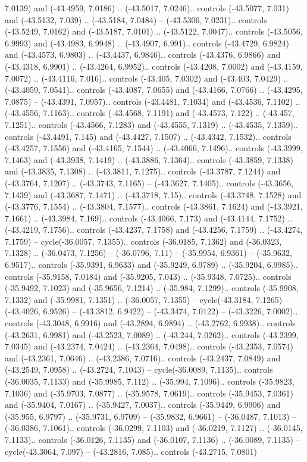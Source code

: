 \begin{scope}[shift={(2.5552, 9.9912)}]
\begin{scope}[shift={(48.1654, -14.8546)}]
7.0139) and (-43.4959, 7.0186) .. (-43.5017, 7.0246).. controls (-43.5077, 7.031) and (-43.5132, 7.039) .. (-43.5184, 7.0484) -- (-43.5306, 7.0231).. controls (-43.5249, 7.0162) and (-43.5187, 7.0101) .. (-43.5122, 7.0047).. controls (-43.5056, 6.9993) and (-43.4983, 6.9948) .. (-43.4907, 6.991).. controls (-43.4729, 6.9824) and (-43.4573, 6.9803) .. (-43.4437, 6.9846).. controls (-43.4376, 6.9866) and (-43.4318, 6.9901) .. (-43.4264, 6.9952).. controls (-43.4208, 7.0002) and (-43.4159, 7.0072) .. (-43.4116, 7.016).. controls (-43.405, 7.0302) and (-43.403, 7.0429) .. (-43.4059, 7.0541).. controls (-43.4087, 7.0655) and (-43.4166, 7.0766) .. (-43.4295, 7.0875) -- (-43.4391, 7.0957).. controls (-43.4481, 7.1034) and (-43.4536, 7.1102) .. (-43.4556, 7.1163).. controls (-43.4568, 7.1191) and (-43.4573, 7.122) .. (-43.457, 7.1251).. controls (-43.4566, 7.1283) and (-43.4555, 7.1319) .. (-43.4535, 7.1359).. controls (-43.4491, 7.145) and (-43.4427, 7.1507) .. (-43.4342, 7.1532).. controls (-43.4257, 7.1556) and (-43.4165, 7.1544) .. (-43.4066, 7.1496).. controls (-43.3999, 7.1463) and (-43.3938, 7.1419) .. (-43.3886, 7.1364).. controls (-43.3859, 7.1338) and (-43.3835, 7.1308) .. (-43.3811, 7.1275).. controls (-43.3787, 7.1244) and (-43.3764, 7.1207) .. (-43.3743, 7.1165) -- (-43.3627, 7.1405).. controls (-43.3656, 7.1439) and (-43.3687, 7.1471) .. (-43.3718, 7.15).. controls (-43.3748, 7.1528) and (-43.3776, 7.1554) .. (-43.3804, 7.1577).. controls (-43.3861, 7.1624) and (-43.3921, 7.1661) .. (-43.3984, 7.169).. controls (-43.4066, 7.173) and (-43.4144, 7.1752) .. (-43.4219, 7.1756).. controls (-43.4237, 7.1758) and (-43.4256, 7.1759) .. (-43.4274, 7.1759) -- cycle(-36.0057, 7.1355).. controls (-36.0185, 7.1362) and (-36.0323, 7.1328) .. (-36.0473, 7.1256) -- (-36.0796, 7.11) -- (-35.9954, 6.9361) -- (-35.9632, 6.9517).. controls (-35.9391, 6.9633) and (-35.9249, 6.9789) .. (-35.9204, 6.9985).. controls (-35.9158, 7.0184) and (-35.9205, 7.043) .. (-35.9348, 7.0725).. controls (-35.9492, 7.1023) and (-35.9656, 7.1214) .. (-35.984, 7.1299).. controls (-35.9908, 7.1332) and (-35.9981, 7.1351) .. (-36.0057, 7.1355) -- cycle(-43.3184, 7.1265) -- (-43.4026, 6.9526) -- (-43.3812, 6.9422) -- (-43.3474, 7.0122) -- (-43.3226, 7.0002).. controls (-43.3048, 6.9916) and (-43.2894, 6.9894) .. (-43.2762, 6.9938).. controls (-43.2631, 6.9981) and (-43.2523, 7.0089) .. (-43.244, 7.0262).. controls (-43.2399, 7.0345) and (-43.2374, 7.0424) .. (-43.2364, 7.0498).. controls (-43.2353, 7.0574) and (-43.2361, 7.0646) .. (-43.2386, 7.0716).. controls (-43.2437, 7.0849) and (-43.2549, 7.0958) .. (-43.2724, 7.1043) -- cycle(-36.0089, 7.1135).. controls (-36.0035, 7.1133) and (-35.9985, 7.112) .. (-35.994, 7.1096).. controls (-35.9823, 7.1036) and (-35.9703, 7.0877) .. (-35.9578, 7.0619).. controls (-35.9453, 7.0361) and (-35.9404, 7.0167) .. (-35.9427, 7.0037).. controls (-35.9449, 6.9906) and (-35.955, 6.9797) .. (-35.9731, 6.9709) -- (-35.9832, 6.9661) -- (-36.0487, 7.1013) -- (-36.0386, 7.1061).. controls (-36.0299, 7.1103) and (-36.0219, 7.1127) .. (-36.0145, 7.1133).. controls (-36.0126, 7.1135) and (-36.0107, 7.1136) .. (-36.0089, 7.1135) -- cycle(-43.3064, 7.097) -- (-43.2816, 7.085).. controls (-43.2715, 7.0801) 
\end{scope}
\end{scope}
